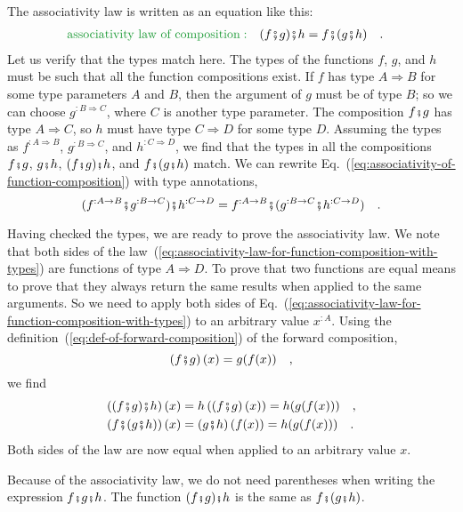 The associativity law is written as an equation like this:
\begin{align}
{\color{greenunder}\text{associativity law of composition}:}\quad & (f\bef g)\bef h=f\bef(g\bef h)\quad.\label{eq:associativity-of-function-composition}
\end{align}
Let us verify that the types match here. The types of the functions
$f$, $g$, and $h$ must be such that all the function compositions
exist. If $f$ has type $A\Rightarrow B$ for some type parameters
$A$ and $B$, then the argument of $g$ must be of type $B$; so
we can choose $g^{:B\Rightarrow C}$, where $C$ is another type parameter.
The composition $f\bef g$ has type $A\Rightarrow C$, so $h$ must
have type $C\Rightarrow D$ for some type $D$. Assuming the types
as $f^{:A\Rightarrow B}$, $g^{:B\Rightarrow C}$, and $h^{:C\Rightarrow D}$,
we find that the types in all the compositions $f\bef g$, $g\bef h$,
$(f\bef g)\bef h$, and $f\bef(g\bef h)$ match. We can rewrite Eq.~(\ref{eq:associativity-of-function-composition})
with type annotations, 
\begin{equation}
(f^{:A\Rightarrow B}\bef g^{:B\Rightarrow C})\bef h^{:C\Rightarrow D}=f^{:A\Rightarrow B}\bef(g^{:B\Rightarrow C}\bef h^{:C\Rightarrow D})\quad.\label{eq:associativity-law-for-function-composition-with-types}
\end{equation}

Having checked the types, we are ready to prove the associativity
law. We note that both sides of the law~(\ref{eq:associativity-law-for-function-composition-with-types})
are functions of type $A\Rightarrow D$. To prove that two functions
are equal means to prove that they always return the same results
when applied to the same arguments. So we need to apply both sides
of Eq.~(\ref{eq:associativity-law-for-function-composition-with-types})
to an arbitrary value $x^{:A}$. Using the definition~(\ref{eq:def-of-forward-composition})
of the forward composition, 
\[
\left(f\bef g\right)(x)=g(f(x))\quad,
\]
we find
\begin{align*}
\left((f\bef g)\bef h\right)(x) & =h\left(\left(f\bef g\right)(x)\right)=h(g(f(x)))\quad,\\
\left(f\bef(g\bef h)\right)(x) & =\left(g\bef h\right)(f(x))=h(g(f(x)))\quad.
\end{align*}
Both sides of the law are now equal when applied to an arbitrary value
$x$.

Because of the associativity law, we do not need parentheses when
writing the expression $f\bef g\bef h$. The function $(f\bef g)\bef h$
is the same as $f\bef(g\bef h)$.

